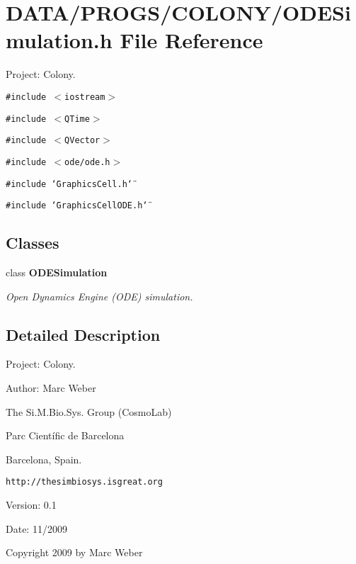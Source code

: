 \section{DATA/PROGS/COLONY/ODESimulation.h File Reference}
\label{ODESimulation_8h}
Project: Colony. 

{\tt \#include $<$iostream$>$}\par
{\tt \#include $<$QTime$>$}\par
{\tt \#include $<$QVector$>$}\par
{\tt \#include $<$ode/ode.h$>$}\par
{\tt \#include \char`\"{}GraphicsCell.h\char`\"{}}\par
{\tt \#include \char`\"{}GraphicsCellODE.h\char`\"{}}\par
\subsection*{Classes}
\begin{CompactItemize}
\item 
class {\bf ODESimulation}
\begin{CompactList}\small\item\em Open Dynamics Engine (ODE) simulation. \item\end{CompactList}\end{CompactItemize}


\subsection{Detailed Description}
Project: Colony. 

\begin{Desc}
\item[Author:]Marc Weber\par
 The Si.M.Bio.Sys. Group (CosmoLab)\par
 Parc Científic de Barcelona\par
 Barcelona, Spain.\par
 {\tt http://thesimbiosys.isgreat.org} \end{Desc}
\begin{Desc}
\item[Version:]0.1 \end{Desc}
\begin{Desc}
\item[Date:]11/2009\end{Desc}
Copyright 2009 by Marc Weber 